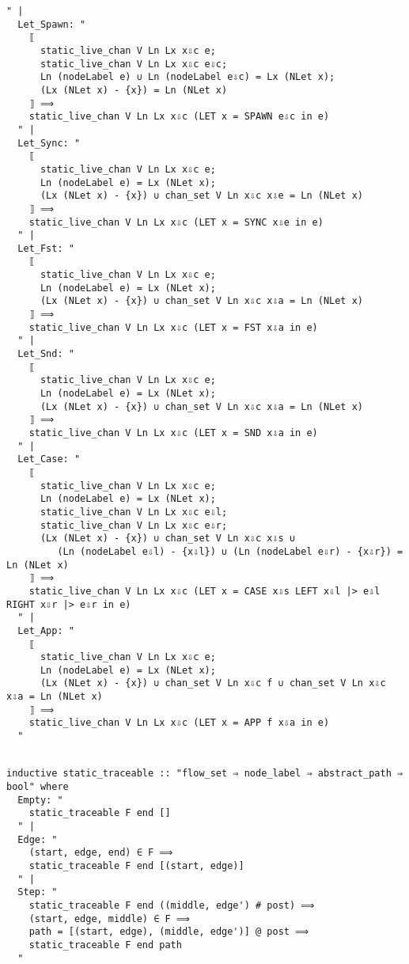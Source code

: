 \documentclass{article}
\begin{document}
\begin{lstlisting}[style=codestyle1, escapechar=\%]
  " |
  Let_Spawn: "
    ⟦
      static_live_chan V Ln Lx x⇩c e;
      static_live_chan V Ln Lx x⇩c e⇩c;
      Ln (nodeLabel e) ∪ Ln (nodeLabel e⇩c) = Lx (NLet x);
      (Lx (NLet x) - {x}) = Ln (NLet x)
    ⟧ ⟹
    static_live_chan V Ln Lx x⇩c (LET x = SPAWN e⇩c in e)
  " |
  Let_Sync: "
    ⟦
      static_live_chan V Ln Lx x⇩c e;
      Ln (nodeLabel e) = Lx (NLet x);
      (Lx (NLet x) - {x}) ∪ chan_set V Ln x⇩c x⇩e = Ln (NLet x)
    ⟧ ⟹
    static_live_chan V Ln Lx x⇩c (LET x = SYNC x⇩e in e)
  " |
  Let_Fst: "
    ⟦
      static_live_chan V Ln Lx x⇩c e;
      Ln (nodeLabel e) = Lx (NLet x);
      (Lx (NLet x) - {x}) ∪ chan_set V Ln x⇩c x⇩a = Ln (NLet x)
    ⟧ ⟹
    static_live_chan V Ln Lx x⇩c (LET x = FST x⇩a in e)
  " |
  Let_Snd: "
    ⟦
      static_live_chan V Ln Lx x⇩c e;
      Ln (nodeLabel e) = Lx (NLet x);
      (Lx (NLet x) - {x}) ∪ chan_set V Ln x⇩c x⇩a = Ln (NLet x)
    ⟧ ⟹
    static_live_chan V Ln Lx x⇩c (LET x = SND x⇩a in e)
  " |
  Let_Case: "
    ⟦
      static_live_chan V Ln Lx x⇩c e;
      Ln (nodeLabel e) = Lx (NLet x);
      static_live_chan V Ln Lx x⇩c e⇩l;
      static_live_chan V Ln Lx x⇩c e⇩r;
      (Lx (NLet x) - {x}) ∪ chan_set V Ln x⇩c x⇩s ∪ 
         (Ln (nodeLabel e⇩l) - {x⇩l}) ∪ (Ln (nodeLabel e⇩r) - {x⇩r}) = Ln (NLet x)
    ⟧ ⟹
    static_live_chan V Ln Lx x⇩c (LET x = CASE x⇩s LEFT x⇩l |> e⇩l RIGHT x⇩r |> e⇩r in e)
  " |
  Let_App: "
    ⟦
      static_live_chan V Ln Lx x⇩c e;
      Ln (nodeLabel e) = Lx (NLet x);
      (Lx (NLet x) - {x}) ∪ chan_set V Ln x⇩c f ∪ chan_set V Ln x⇩c x⇩a = Ln (NLet x)
    ⟧ ⟹
    static_live_chan V Ln Lx x⇩c (LET x = APP f x⇩a in e)
  "

  \end{lstlisting}


\begin{lstlisting}[style=codestyle1, escapechar=\%]

inductive static_traceable :: "flow_set ⇒ node_label ⇒ abstract_path ⇒ bool" where
  Empty: "
    static_traceable F end []
  " |
  Edge: "
    (start, edge, end) ∈ F ⟹
    static_traceable F end [(start, edge)]
  " |
  Step: "
    static_traceable F end ((middle, edge') # post) ⟹
    (start, edge, middle) ∈ F ⟹
    path = [(start, edge), (middle, edge')] @ post ⟹
    static_traceable F end path
  "

  \end{lstlisting}
\end{document}
